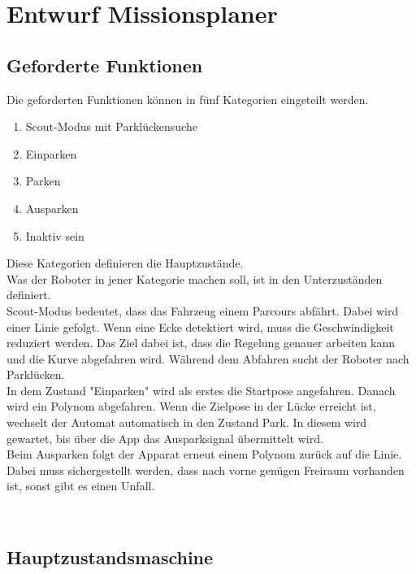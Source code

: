 \chapter{Entwurf Missionsplaner}

\section{Geforderte Funktionen}

Die geforderten Funktionen können in fünf Kategorien eingeteilt werden.
\renewcommand{\labelenumi}{\roman{enumi}}
\begin{enumerate}
\item 	Scout-Modus mit Parklückensuche
\item 	Einparken
\item	Parken
\item	Ausparken
\item	Inaktiv sein
\end{enumerate}

\noindent Diese Kategorien definieren die Hauptzustände.\\

\noindent Was der Roboter in jener Kategorie machen soll, ist in den Unterzuständen definiert.\\


\noindent Scout-Modus bedeutet, dass das Fahrzeug einem Parcours abfährt. Dabei wird einer Linie gefolgt. Wenn eine Ecke detektiert wird, muss die Geschwindigkeit reduziert werden. Das Ziel dabei ist, dass die Regelung genauer arbeiten kann und die Kurve abgefahren wird. Während dem Abfahren sucht der Roboter nach Parklücken.\\


\noindent In dem Zustand "Einparken" wird als erstes die Startpose angefahren. Danach wird ein Polynom abgefahren. Wenn die Zielpose in der Lücke erreicht ist, wechselt der Automat automatisch in den Zustand Park. In diesem wird gewartet, bis über die App das Ausparksignal übermittelt wird.\\


\noindent Beim Ausparken folgt der Apparat erneut einem Polynom zurück auf die Linie. Dabei muss sichergestellt werden, dass nach vorne genügen Freiraum vorhanden ist, sonst gibt es einen Unfall.

\\


\section{Hauptzustandsmaschine}

